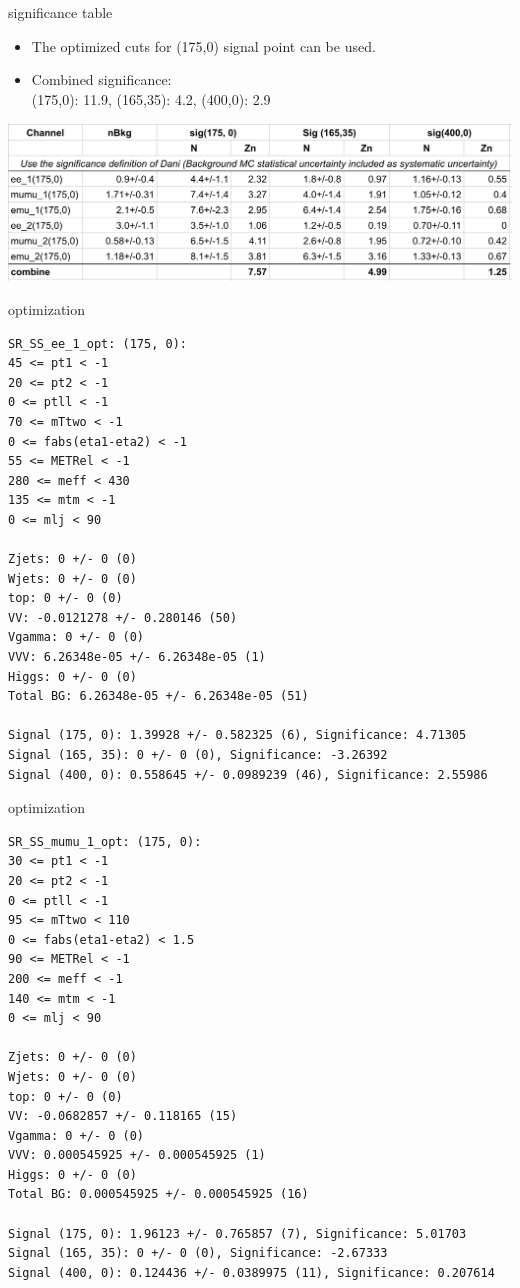 \documentclass[mathserif,serif]{beamer}
\begin{document}
\begin{frame}{significance table}
\begin{itemize}
\item The optimized cuts for (175,0) signal point can be used.
\item Combined significance: \\
(175,0): 11.9, (165,35): 4.2, (400,0): 2.9
\end{itemize}
\includegraphics[width=\textwidth]{data/optimization/dongliang.png}
\end{frame}

\begin{frame}[fragile]{optimization}
\tiny
\begin{verbatim}
SR_SS_ee_1_opt: (175, 0):
45 <= pt1 < -1
20 <= pt2 < -1
0 <= ptll < -1
70 <= mTtwo < -1
0 <= fabs(eta1-eta2) < -1
55 <= METRel < -1
280 <= meff < 430
135 <= mtm < -1
0 <= mlj < 90

Zjets: 0 +/- 0 (0)
Wjets: 0 +/- 0 (0)
top: 0 +/- 0 (0)
VV: -0.0121278 +/- 0.280146 (50)
Vgamma: 0 +/- 0 (0)
VVV: 6.26348e-05 +/- 6.26348e-05 (1)
Higgs: 0 +/- 0 (0)
Total BG: 6.26348e-05 +/- 6.26348e-05 (51)

Signal (175, 0): 1.39928 +/- 0.582325 (6), Significance: 4.71305
Signal (165, 35): 0 +/- 0 (0), Significance: -3.26392
Signal (400, 0): 0.558645 +/- 0.0989239 (46), Significance: 2.55986
\end{verbatim}
\end{frame}

\begin{frame}[fragile]{optimization}
\tiny
\begin{verbatim}
SR_SS_mumu_1_opt: (175, 0):
30 <= pt1 < -1
20 <= pt2 < -1
0 <= ptll < -1
95 <= mTtwo < 110
0 <= fabs(eta1-eta2) < 1.5
90 <= METRel < -1
200 <= meff < -1
140 <= mtm < -1
0 <= mlj < 90

Zjets: 0 +/- 0 (0)
Wjets: 0 +/- 0 (0)
top: 0 +/- 0 (0)
VV: -0.0682857 +/- 0.118165 (15)
Vgamma: 0 +/- 0 (0)
VVV: 0.000545925 +/- 0.000545925 (1)
Higgs: 0 +/- 0 (0)
Total BG: 0.000545925 +/- 0.000545925 (16)

Signal (175, 0): 1.96123 +/- 0.765857 (7), Significance: 5.01703
Signal (165, 35): 0 +/- 0 (0), Significance: -2.67333
Signal (400, 0): 0.124436 +/- 0.0389975 (11), Significance: 0.207614
\end{verbatim}
\end{frame}
\end{document}
